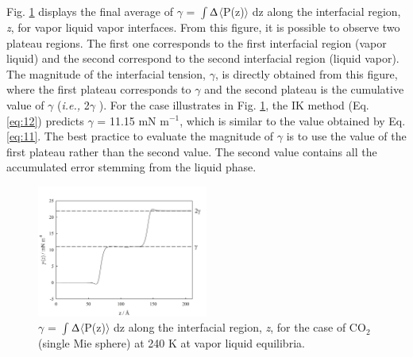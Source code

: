 \documentclass[9pt,bestpractices]{livecoms}
\begin{document}
Fig. \ref{fig:18} displays the final average of ${\gamma}$
= ${\int}$${\Updelta}$${\langle}$P(z)${\rangle}$ dz along the interfacial
region, \textit{z}, for vapor \textendash{} liquid \textendash{} vapor
interfaces. From this figure, it is possible to observe two plateau regions.
The first one corresponds to the first interfacial region (vapor \textendash{}
liquid) and the second correspond to the second interfacial region (liquid
\textendash{} vapor). The magnitude of the interfacial tension, ${\gamma}$, is
directly obtained from this figure, where the first plateau corresponds to
${\gamma}$ and the second plateau is the cumulative value of ${\gamma}$
(\textit{i.e.,} 2${\gamma}$ ). For the case illustrates in Fig. \ref{fig:18}, the IK
method (Eq. \ref{eq:12}) predicts ${\gamma}$ = 11.15 mN m$^{-1}$, which is similar to
the value obtained by Eq. \ref{eq:11}.
The best practice to evaluate the magnitude of ${\gamma}$ is to use the value
of the first plateau rather than the second value. The second value contains
all the accumulated error stemming from the liquid phase.
\begin{figure}
\includegraphics[width=0.5\textwidth]{gfx/image63.jpeg}
\caption{${\gamma}$ = ${\int}$${\Updelta}$${\langle}$P(z)${\rangle}$ dz along the interfacial region, \textit{z}, for the case of CO$_{2}$ (single Mie sphere) at 240 K at vapor \textendash{} liquid equilibria.}
\label{fig:18}
\end{figure}
\end{document}
